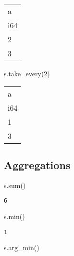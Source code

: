 \documentclass[
  letterpaper,
  DIV=11,
  numbers=noendperiod]{scrartcl}
\newenvironment{Shaded}{\begin{snugshade}}{\end{snugshade}}
\newcommand{\BuiltInTok}[1]{\textcolor[rgb]{0.00,0.23,0.31}{#1}}
\newcommand{\DecValTok}[1]{\textcolor[rgb]{0.68,0.00,0.00}{#1}}
\newcommand{\NormalTok}[1]{\textcolor[rgb]{0.00,0.23,0.31}{#1}}
\begin{document}
\begin{longtable}[]{@{}l@{}}
\toprule()
a \\
i64 \\
\midrule()
\endhead
2 \\
3 \\
\bottomrule()
\end{longtable}

\begin{Shaded}
\begin{Highlighting}[]
\NormalTok{s.take\_every(}\DecValTok{2}\NormalTok{)}
\end{Highlighting}
\end{Shaded}

\begin{longtable}[]{@{}l@{}}
\toprule()
a \\
i64 \\
\midrule()
\endhead
1 \\
3 \\
\bottomrule()
\end{longtable}

\hypertarget{aggregations}{%
\subsection{Aggregations}\label{aggregations}}

\begin{Shaded}
\begin{Highlighting}[]
\NormalTok{s.}\BuiltInTok{sum}\NormalTok{()}
\end{Highlighting}
\end{Shaded}

\begin{verbatim}
6
\end{verbatim}

\begin{Shaded}
\begin{Highlighting}[]
\NormalTok{s.}\BuiltInTok{min}\NormalTok{()}
\end{Highlighting}
\end{Shaded}

\begin{verbatim}
1
\end{verbatim}

\begin{Shaded}
\begin{Highlighting}[]
\NormalTok{s.arg\_min()}
\end{Highlighting}
\end{Shaded}
\end{document}
